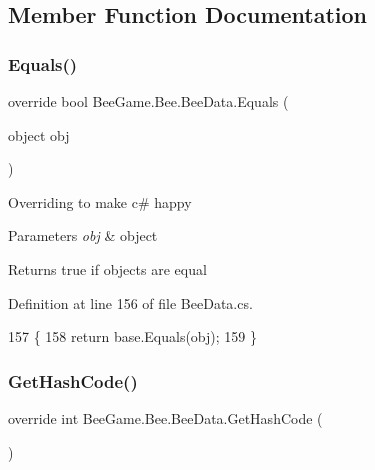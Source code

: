 \subsection{Member Function Documentation}
\mbox{\label{struct_bee_game_1_1_bee_1_1_bee_data_a5909cd9eb6bbe6f7f2ef348e135b6c86}} 
\subsubsection{\texorpdfstring{Equals()}{Equals()}}
{\footnotesize\ttfamily override bool Bee\+Game.\+Bee.\+Bee\+Data.\+Equals (\begin{DoxyParamCaption}\item[{object}]{obj }\end{DoxyParamCaption})}



Overriding to make c\# happy 


\begin{DoxyParams}{Parameters}
{\em obj} & object\\
\hline
\end{DoxyParams}
\begin{DoxyReturn}{Returns}
true if objects are equal
\end{DoxyReturn}


Definition at line 156 of file Bee\+Data.\+cs.


\begin{DoxyCode}
157         \{
158             \textcolor{keywordflow}{return} base.Equals(obj);
159         \}
\end{DoxyCode}
\mbox{\label{struct_bee_game_1_1_bee_1_1_bee_data_ab11b7e2d244cb0021c52ae0b839ff6c3}} 
\subsubsection{\texorpdfstring{Get\+Hash\+Code()}{GetHashCode()}}
{\footnotesize\ttfamily override int Bee\+Game.\+Bee.\+Bee\+Data.\+Get\+Hash\+Code (\begin{DoxyParamCaption}{ }\end{DoxyParamCaption})}



